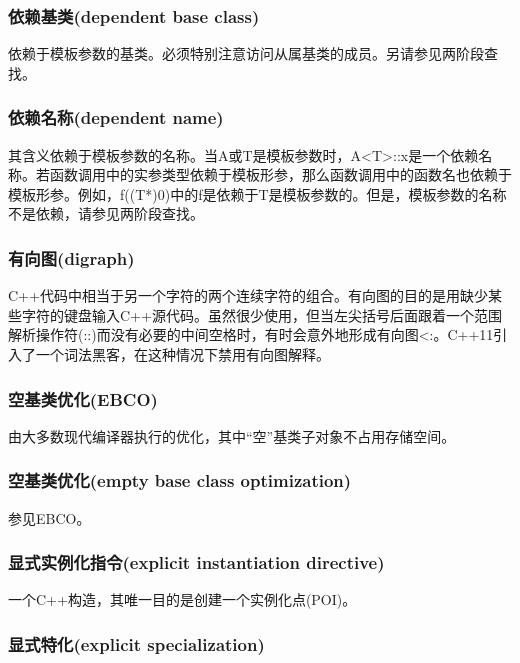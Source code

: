 \subsubsection{依赖基类(dependent base class)}

依赖于模板参数的基类。必须特别注意访问从属基类的成员。另请参见两阶段查找。

\subsubsection{依赖名称(dependent name)}

其含义依赖于模板参数的名称。当A或T是模板参数时，A<T>::x是一个依赖名称。若函数调用中的实参类型依赖于模板形参，那么函数调用中的函数名也依赖于模板形参。例如，f((T*)0)中的f是依赖于T是模板参数的。但是，模板参数的名称不是依赖，请参见两阶段查找。

\subsubsection{有向图(digraph)}

C++代码中相当于另一个字符的两个连续字符的组合。有向图的目的是用缺少某些字符的键盘输入C++源代码。虽然很少使用，但当左尖括号后面跟着一个范围解析操作符(::)而没有必要的中间空格时，有时会意外地形成有向图<:。C++11引入了一个词法黑客，在这种情况下禁用有向图解释。

\subsubsection{空基类优化(EBCO)}

由大多数现代编译器执行的优化，其中“空”基类子对象不占用存储空间。

\subsubsection{空基类优化(empty base class optimization)}

参见EBCO。

\subsubsection{显式实例化指令(explicit instantiation directive)}

一个C++构造，其唯一目的是创建一个实例化点(POI)。

\subsubsection{显式特化(explicit specialization)}

